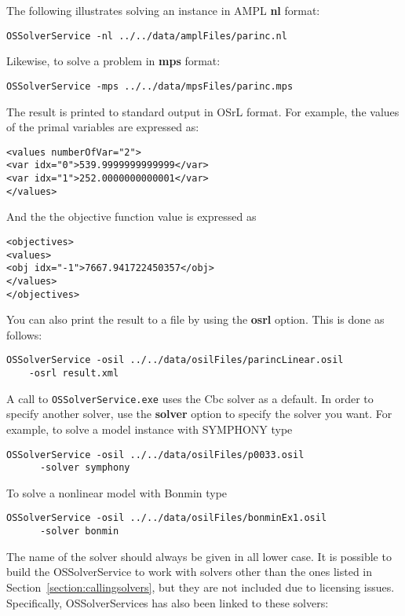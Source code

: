 \documentclass[11pt]{article}
\renewcommand{\{}{{\char"7B}}
\renewcommand{\}}{{\char"7D}}
\renewcommand{\^}{{\char"0D}}
\renewcommand{\'}{{\char"0D}}
\begin{document}
The following illustrates solving an instance in AMPL {\bf nl} format:

\begin{verbatim}
OSSolverService -nl ../../data/amplFiles/parinc.nl
\end{verbatim}

Likewise, to solve a problem in {\bf mps} format:

\begin{verbatim}
OSSolverService -mps ../../data/mpsFiles/parinc.mps
\end{verbatim}


The result is printed to standard output in OSrL format. For example, the values of the primal 
variables are expressed as:

\begin{verbatim}
<values numberOfVar="2">
<var idx="0">539.9999999999999</var>
<var idx="1">252.0000000000001</var>
</values>
\end{verbatim}
And the the objective function value is expressed as
\begin{verbatim}
<objectives>
<values>
<obj idx="-1">7667.941722450357</obj>
</values>
</objectives>
\end{verbatim}
You can also print the result to a file by using the {\bf osrl} option. This is done as follows:
{\small
\begin{verbatim}
OSSolverService -osil ../../data/osilFiles/parincLinear.osil 
    -osrl result.xml
\end{verbatim}
}


A call to {\tt OSSolverService.exe} uses the Cbc solver as a default. In order to specify 
another solver, use  the {\bf solver} option to specify the solver you want. For example, 
to solve a model instance with SYMPHONY type

{\small
\begin{verbatim}
OSSolverService -osil ../../data/osilFiles/p0033.osil 
      -solver symphony
\end{verbatim}
}
To solve a nonlinear model with Bonmin type
{\small
\begin{verbatim}
OSSolverService -osil ../../data/osilFiles/bonminEx1.osil 
      -solver bonmin
\end{verbatim}
}
The name of the solver should always be given in all lower case.  It is possible to build the 
OSSolverService to work with solvers other than the ones listed in Section~\ref{section:callingsolvers},
but they are not included due to licensing issues. Specifically, OSSolverServices has also been linked
to these solvers:
\end{document}
